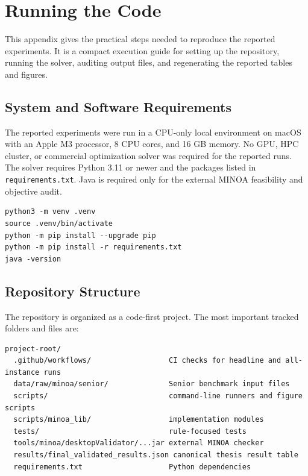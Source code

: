 \chapter{Running the Code}
\label{app:reproducibility}

This appendix gives the practical steps needed to reproduce the reported
experiments. It is a compact execution guide for setting up the repository,
running the solver, auditing output files, and regenerating the reported tables
and figures.

\section{System and Software Requirements}

The reported experiments were run in a CPU-only local environment on macOS with
an Apple M3 processor, 8 CPU cores, and 16 GB memory. No GPU, HPC cluster, or
commercial optimization solver was required for the reported runs. The solver
requires Python 3.11 or newer and the packages listed in
\texttt{requirements.txt}. Java is required only for the external MINOA
feasibility and objective audit.

\begin{lstlisting}[basicstyle=\ttfamily\scriptsize,breaklines=true,aboveskip=4pt,belowskip=4pt]
python3 -m venv .venv
source .venv/bin/activate
python -m pip install --upgrade pip
python -m pip install -r requirements.txt
java -version
\end{lstlisting}

\section{Repository Structure}

The repository is organized as a code-first project. The most important tracked
folders and files are:

\begin{lstlisting}[basicstyle=\ttfamily\scriptsize,breaklines=true,aboveskip=4pt,belowskip=4pt]
project-root/
  .github/workflows/                  CI checks for headline and all-instance runs
  data/raw/minoa/senior/              Senior benchmark input files
  scripts/                            command-line runners and figure scripts
  scripts/minoa_lib/                  implementation modules
  tests/                              rule-focused tests
  tools/minoa/desktopValidator/...jar external MINOA checker
  results/final_validated_results.json canonical thesis result table
  requirements.txt                    Python dependencies
\end{lstlisting}

